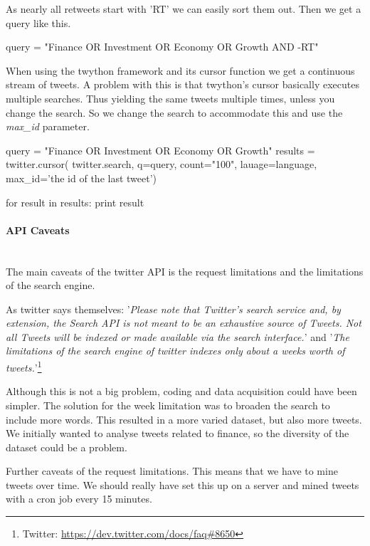 As nearly all retweets start with 'RT' we can easily sort them out. Then we get
a query like this. 
\begin{python}
query = "Finance OR Investment OR Economy OR Growth AND -RT"
\end{python}

When using the twython framework and its cursor function we get a continuous
stream of tweets. A problem with this is that twython's cursor basically
executes multiple searches. Thus yielding the same tweets multiple times,
unless you change the search. So we change the search to accommodate this and
use the \textit{max\_id} parameter.
\begin{python}
query = "Finance OR Investment OR Economy OR Growth"
results = twitter.cursor(
                twitter.search,
                q=query,
                count="100",
                lauage=language,
                max_id='the id of the last tweet')

for result in results:
    print result
\end{python}
%

\paragraph{API Caveats}
\hspace{0pt}\\
The main caveats of the twitter API is the request limitations and the
limitations of the search engine. 

As twitter says themselves: 
'\textit{Please note that Twitter's search service and, by extension, the Search
API is not meant to be an exhaustive source of Tweets. Not all Tweets will be
indexed or made available via the search interface.}' and 
'\textit{The limitations of the search engine of twitter indexes only about a
weeks worth of tweets.}'\footnote{Twitter:
\url{https://dev.twitter.com/docs/faq#8650}}

Although this is not a big problem, coding and data acquisition could have been
simpler. The solution for the week limitation was to broaden the search to
include more words. This resulted in a more varied dataset, but also more
tweets. We initially wanted to analyse tweets related to finance, so the
diversity of the dataset could be a problem. 

Further caveats of the request limitations. This means that we have to mine
tweets over time. We should really have set this up on a server and mined
tweets with a cron job every 15 minutes.
%

